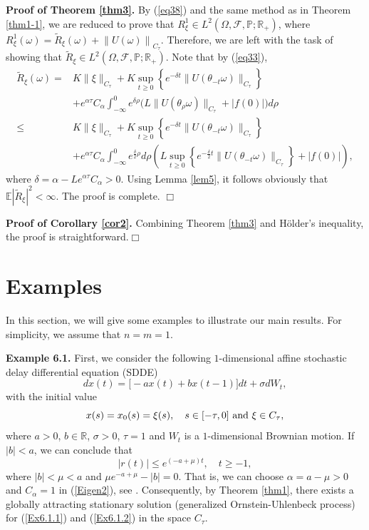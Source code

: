 \documentclass[preprint,12pt]{elsarticle}
\begin{document}
\noindent
{\bf Proof of Theorem \ref{thm3}.} By  (\ref{eq38}) and the same method as in Theorem \ref{thm1-1}, we are reduced to prove that $R_\xi^1\in L^2(\Omega,\mathscr{F},\mathbb{P};\mathbb{R}_+)$, where $R_\xi^1(\omega)=\widetilde{R}_\xi(\omega)+\left\|U(\omega)\right\|_{C_\tau}$. Therefore, we are left with the task of showing that $\widetilde{R}_\xi\in L^2(\Omega,\mathscr{F},\mathbb{P};\mathbb{R}_+)$. Note that by (\ref{eq33}),
\begin{align}\label{eq52}
\widetilde{R}_\xi(\omega)=&K\|\xi\|_{C_\tau}+K\sup_{t\geq0}\left\{e^{-\delta t}\|U(\theta_{-t}\omega)\|_{C_\tau}\right\}\nonumber\\
&+e^{\alpha\tau}C_\alpha\int_{-\infty}^0e^{\delta\rho}\bigl(L\|U(\theta_{\rho}\omega)\|_{C_\tau}+|f(0)|\bigr)d\rho\nonumber\\
\leq&K\|\xi\|_{C_\tau}+K\sup_{t\geq0}\left\{e^{-\delta t}\|U(\theta_{-t}\omega)\|_{C_\tau}\right\}\nonumber\\
&+e^{\alpha\tau}C_\alpha\int_{-\infty}^0e^{\frac\delta2\rho}d\rho\left(L\sup_{t\geq0}\left\{e^{-\frac\delta2t}\|U(\theta_{-t}\omega)\|_{C_\tau}\right\}+|f(0)|\right),\nonumber
\end{align}
where $\delta=\alpha-Le^{\alpha\tau}C_\alpha>0$. Using Lemma \ref{lem5}, it follows obviously that $\mathbb{E}|\widetilde{R}_\xi|^2<\infty$. The proof is complete.
\quad\quad$\Box$

\noindent
{\bf Proof of Corollary \ref{cor2}.} Combining Theorem \ref{thm3} and H\"{o}lder's inequality, the proof is straightforward.\quad\quad$\Box$

\section{Examples}
In this section, we will give some examples to illustrate our main results. For simplicity, we assume that $n=m=1$.

\noindent
{\bf Example 6.1.} First, we consider the following $1$-dimensional affine stochastic delay differential equation (SDDE)
\begin{equation}\label{Ex6.1.1}
dx(t)=\bigl[-ax(t)+bx(t-1)\bigr]dt+\sigma dW_t,\end{equation}
with the initial value
\begin{equation}\label{Ex6.1.2}x(s)=x_0(s)=\xi(s),\quad s\in[-\tau,0]\ {\rm and}\ \xi\in C_\tau,
\end{equation}
where $a>0$, $b\in\mathbb{R}$, $\sigma>0$, $\tau=1$ and $W_t$ is a $1$-dimensional Brownian motion. If $|b|<a$, we can conclude that
\begin{equation}\label{Ex6.1.3}
|r(t)|\leq e^{(-a+\mu)t},\quad t\geq-1,\end{equation}
where $|b|<\mu<a$ and $\mu e^{-a+\mu}-|b|=0$. That is, we can choose $\alpha=a-\mu>0$ and $C_\alpha=1$ in (\ref{Eigen2}), see \cite[p.392]{LM}. Consequently, by Theorem \ref{thm1}, there exists a globally attracting stationary solution (generalized Ornstein-Uhlenbeck process) for (\ref{Ex6.1.1}) and (\ref{Ex6.1.2}) in the space $C_\tau$.
\end{document}
